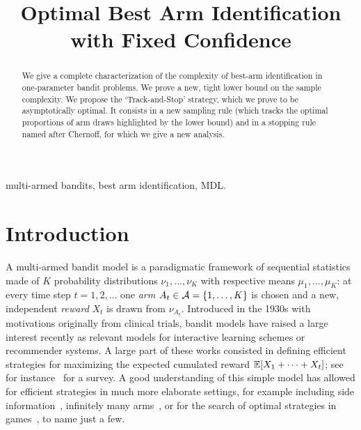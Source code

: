 \documentclass{colt2016} %
\title[Optimal Best Arm Identification with Fixed Confidence]{Optimal Best Arm Identification with Fixed Confidence}
\begin{document}
\maketitle

\begin{abstract}
We give a complete characterization of the complexity of best-arm identification in one-parameter bandit problems. We prove a new, tight lower bound on the sample complexity. We propose the `Track-and-Stop' strategy, which we prove to be asymptotically optimal. It consists in a new sampling rule (which tracks the optimal proportions of arm draws highlighted by the lower bound) and in a stopping rule named after Chernoff, for which we give a new analysis. 
\end{abstract}

\begin{keywords}
multi-armed bandits, best arm identification, MDL.
\end{keywords}

\section{Introduction}

A multi-armed bandit model is a paradigmatic framework of sequential statistics made of $K$ probability distributions $\nu_1,\dots,\nu_K$ with respective means $\mu_1,\dots,\mu_K$: at every time step $t=1,2,\dots$ one \emph{arm} $A_t\in\mathcal{A}=\{1,\dots,K\}$ is chosen and a new, independent \emph{reward} $X_t$ is drawn from $\nu_{A_t}$.
Introduced in the 1930s with motivations originally from clinical trials, bandit models have raised a large interest recently as relevant models for interactive learning schemes or recommender systems.
A large part of these works consisted in defining efficient strategies for maximizing the expected cumulated reward $\mathbb{E}[X_1+\dots+X_t]$; see for instance~\cite{Bubeck:Survey12} for a survey. %
A good understanding of this simple model has allowed for efficient strategies in much more elaborate settings, for example including side information~\citep{YadLinear11,AGContext13}, infinitely many arms~\citep{SrinivasGPUCB,Bubeck11Xarmed}, or for the search of optimal strategies in games~\citep{SurveyRemiMCTS}, to name just a few. 
\end{document}
